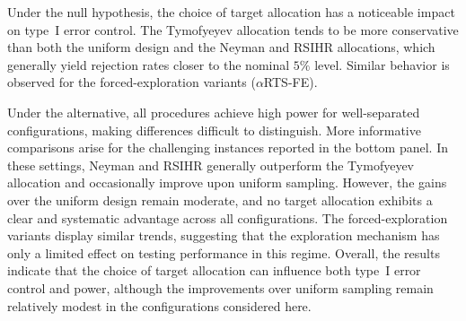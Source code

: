 Under the null hypothesis, the choice of target allocation has a noticeable
	impact on type~I error control. The Tymofyeyev allocation tends to be more
	conservative than both the uniform design and the Neyman and RSIHR
	allocations, which generally yield rejection rates closer to the nominal
	\(5\%\) level. Similar behavior is observed for the
	forced-exploration variants (\(\alpha\)RTS-FE).
	
	Under the alternative, all procedures achieve high power for well-separated configurations, making differences difficult to distinguish. More informative comparisons arise for the challenging instances reported in the
	bottom panel. In these settings, Neyman and RSIHR generally outperform the Tymofyeyev allocation and occasionally improve upon uniform sampling.
	However, the gains over the uniform design remain moderate, and no target allocation exhibits a clear and systematic advantage across all configurations. The forced-exploration variants display similar trends, suggesting that the exploration mechanism has only a limited effect on testing performance in
	this regime. Overall, the results indicate that the choice of target allocation can influence both type~I error control and power, although the
	improvements over uniform sampling remain relatively modest in the configurations considered here.



